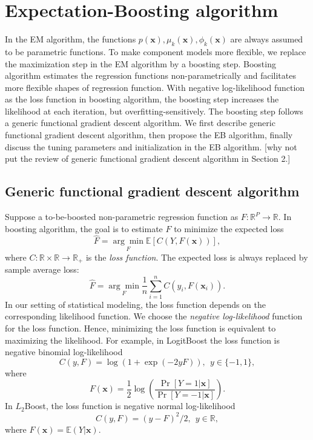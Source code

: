 \documentclass[11pt]{article}
\numberwithin{equation}{section}
\def\R{{\mathbb R}}  %
\def\E{{\mathbb E}}  %
\def\bx{\boldsymbol{x}}
\begin{document}
\section{Expectation-Boosting algorithm}\label{sec:EB}
In the EM algorithm, the functions $p(\bx), \mu_k(\bx), \phi_k(\bx)$ are always assumed to be parametric functions.
To make component models more flexible, we replace the maximization step in the EM algorithm by a boosting step.
Boosting algorithm estimates the regression functions non-parametrically and facilitates more flexible shapes of regression function.
With negative log-likelihood function as the loss function in boosting algorithm, the boosting step increases the likelihood at each iteration, but overfitting-sensitively.
The boosting step follows a generic functional gradient descent algorithm.
We first describe generic functional gradient descent algorithm, then propose the EB algorithm, finally discuss the tuning parameters and initialization in the EB algorithm. {\color{blue}[why not put the review of generic functional gradient descent algorithm in Section 2.]}

\subsection{Generic functional gradient descent algorithm}

	Suppose a to-be-boosted {non-parametric regression function} as $F:\R^P\rightarrow\R$. In boosting algorithm, the goal is to  estimate $F$ to minimize the expected loss $$\hat{F}=\underset{F}{\arg\min}\E\left[C(Y,F(\bx))\right],$$
	where $C:\R\times\R\rightarrow\R_+$ is the \textit{loss function}.
	The expected loss is always replaced by sample average loss:
	$$\hat{F}=\underset{F}{\arg\min}\frac{1}{n}\sum_{i=1}^nC(y_i,F(\bx_i)).$$
	In our setting of statistical modeling, the loss function depends on the corresponding likelihood function.
	We choose the \textit{negative log-likelihood} function for the loss function. Hence, minimizing the loss function is equivalent to maximizing the likelihood.
For example, in LogitBoost the loss function is negative binomial log-likelihood
$$C(y,F)=\log(1+\exp(-2yF)), ~~ y\in\{-1,1\},$$
where 
\begin{equation}\label{logit-link}
F(\bx)=\frac{1}{2}\log\left(\frac{\Pr[Y=1|\bx]}{\Pr[Y=-1|\bx]}\right).
\end{equation}
In $L_2$Boost, the loss function is negative normal log-likelihood
\begin{equation}\label{l2}
	C(y,F)=(y-F)^2/2, ~~ y\in \R,
\end{equation}
where $F(\bx)=\E(Y|\bx).$
\end{document}
